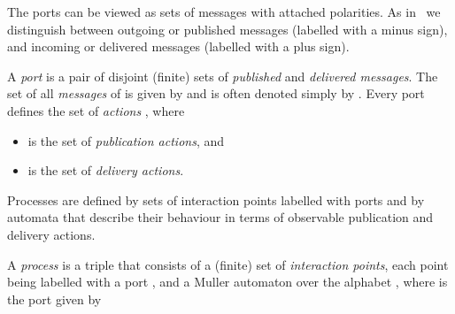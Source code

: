 \documentclass{LMCS}
\begin{document}
The ports can be viewed as sets of messages with attached polarities.  As in~\cite{Brand-Zafiropulo:Communicating-finite-state-machines-1983,Benatallah-Casati-Toumani:Representing-analysing-and-managing-Web-service-protocols-2006} we distinguish between outgoing or published messages (labelled with a minus sign), and incoming or delivered messages (labelled with a plus sign).

\begin{defi}[Port]
  A \emph{port}  is a pair  of disjoint (finite) sets of \emph{published} and \emph{delivered messages}.
  The set of all \emph{messages} of  is given by  and is often denoted simply by .
  Every port  defines the set of \emph{actions} , where
  \begin{itemize}
    
  \item  is the set  of \emph{publication actions}, and
    
  \item  is the set  of \emph{delivery actions}.
    
  \end{itemize}
\end{defi}

Processes are defined by sets of interaction points labelled with ports and by automata that describe their behaviour in terms of observable publication and delivery actions.

\begin{defi}[Process]
  \label{definition:process}
  A \emph{process} is a triple  that consists of a (finite) set  of \emph{interaction points}, each point  being labelled with a port , and a Muller automaton  over the alphabet , where  is the port given by
  
\end{defi}
\end{document}
